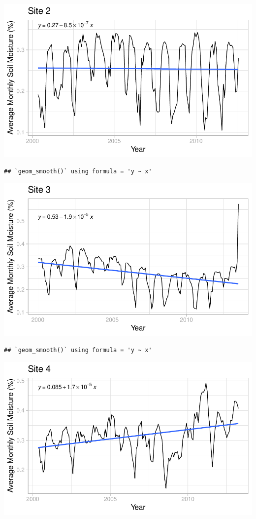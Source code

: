 \documentclass[
  12pt,
]{article}
\begin{document}
\includegraphics{Project_Template_files/figure-latex/Average Monthly Soil Moisture Plots-2.pdf}

\begin{verbatim}
## `geom_smooth()` using formula = 'y ~ x'
\end{verbatim}

\includegraphics{Project_Template_files/figure-latex/Average Monthly Soil Moisture Plots-3.pdf}

\begin{verbatim}
## `geom_smooth()` using formula = 'y ~ x'
\end{verbatim}

\includegraphics{Project_Template_files/figure-latex/Average Monthly Soil Moisture Plots-4.pdf}
\end{document}
